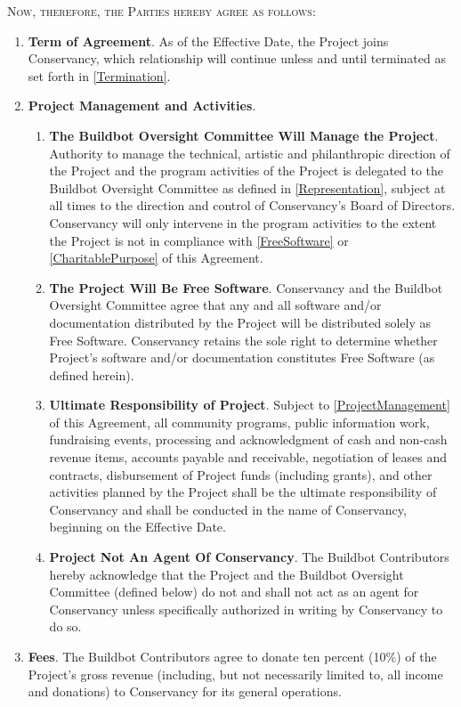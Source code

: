\documentclass[letterpaper,12pt]{article}
\begin{document}
\textsc{Now, therefore, the Parties hereby agree as follows:}

\begin{enumerate}[label=\arabic*.,ref=\S~\arabic*]
\item \textbf{Term of Agreement}. As of the Effective Date, the Project
joins Conservancy, which relationship will continue unless and until
terminated as set forth in \ref{Termination}. 
\item \textbf{Project Management and Activities}.


\begin{enumerate}[label=\alph*.,ref=\theenumi(\alph*)]
\item \textbf{The Buildbot Oversight Committee Will Manage the Project}. \label{ProjectManagement}
Authority to manage the technical, artistic and philanthropic direction
of the Project and the program activities of the Project is delegated
to the Buildbot Oversight Committee as defined in \ref{Representation},
subject at all times to the direction and control of Conservancy's
Board of Directors. Conservancy will only intervene in the program
activities to the extent the Project is not in compliance with \ref{FreeSoftware}
or \ref{CharitablePurpose} of this Agreement. 
\item \textbf{The Project Will Be Free Software}. \label{FreeSoftware}
Conservancy and the Buildbot Oversight Committee agree that any and all software
and/or documentation distributed by the Project will be distributed solely as Free Software.
Conservancy retains the sole right to determine whether Project's
software and/or documentation constitutes Free Software (as defined herein).
\item \textbf{Ultimate Responsibility of Project}. Subject to \ref{ProjectManagement}
of this Agreement, all community programs, public information work,
fundraising events, processing and acknowledgment of cash and non-cash
revenue items, accounts payable and receivable, negotiation of leases
and contracts, disbursement of Project funds (including grants), and
other activities planned by the Project shall be the ultimate responsibility
of Conservancy and shall be conducted in the name of Conservancy,
beginning on the Effective Date. 
\item \textbf{Project Not An Agent Of Conservancy}. The Buildbot Contributors
hereby acknowledge that the Project and the Buildbot Oversight Committee (defined below)
do not and shall not act as an agent for Conservancy unless specifically
authorized in writing by Conservancy to do so. 
\end{enumerate}
\item \textbf{Fees}. The Buildbot Contributors agree to donate ten percent
(10\%) of the Project's gross revenue (including, but not necessarily limited
to, all income and donations) to Conservancy for its general operations.



\end{enumerate}
\end{document}
